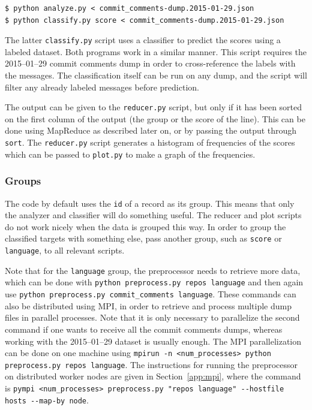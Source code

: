 \documentclass{article}
\begin{document}
\begin{verbatim}
$ python analyze.py < commit_comments-dump.2015-01-29.json
$ python classify.py score < commit_comments-dump.2015-01-29.json
\end{verbatim}

The latter \texttt{classify.py} script uses a classifier to predict the scores 
using a labeled dataset. Both programs work in a similar manner. This script 
requires the 2015--01--29 commit comments dump in order to 
cross-reference the labels with the messages. The classification itself can be 
run on any dump, and the script will filter any already labeled messages before 
prediction.

The output can be given to the \texttt{reducer.py} script, but only if it has 
been sorted on the first column of the output (the group or the score of the 
line). This can be done using MapReduce as described later on, or by passing 
the output through \texttt{sort}. The \texttt{reducer.py} script generates 
a histogram of frequencies of the scores which can be passed to 
\texttt{plot.py} to make a graph of the frequencies.

\subsubsection{Groups}\label{app:groups}
The code by default uses the \texttt{id} of a record as its group. This means 
that only the analyzer and classifier will do something useful. The reducer and 
plot scripts do not work nicely when the data is grouped this way. In order to 
group the classified targets with something else, pass another group, such as 
\texttt{score} or \texttt{language}, to all relevant scripts.

Note that for the \texttt{language} group, the preprocessor needs to retrieve 
more data, which can be done with \texttt{python preprocess.py repos language} 
and then again use \texttt{python preprocess.py commit\_comments language}. 
These commands can also be distributed using MPI, in order to retrieve and 
process multiple dump files in parallel processes. Note that it is only 
necessary to parallelize the second command if one wants to receive all the 
commit comments dumps, whereas working with the 2015--01--29 dataset is 
usually enough. The MPI parallelization can be done on one machine using 
\texttt{mpirun -n <num\_processes> python preprocess.py 
repos language}. The instructions for running the preprocessor on distributed 
worker nodes are given in Section~\ref{app:mpi}, where the command is 
\texttt{pympi <num\_processes> preprocess.py "repos 
language" -{}-hostfile hosts -{}-map-by node}.
\end{document}
